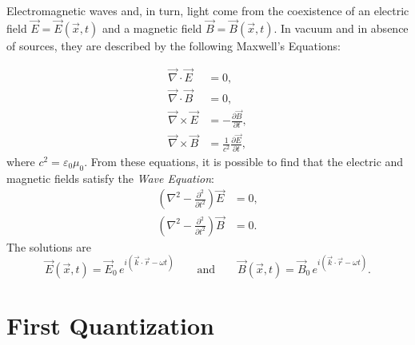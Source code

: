 %
%


Electromagnetic waves and, in turn, light come from the coexistence of an electric field $\vec{E}=\vec{E}(\Vec{x},t)$ and a magnetic field $\vec{B}=\vec{B}(\Vec{x},t)$. In vacuum and in absence of sources, they are described by 
the following  Maxwell's Equations: 

\begin{align}
    \vec{\nabla} \cdot \vec{E} &=0, \label{eq:ME1}\\
    \vec{\nabla}\cdot \vec{B} &=0,\label{eq:ME2} \\
    \vec{\nabla}\times\vec{E} &=-\frac{\partial \vec{B}}{\partial t}, \label{eq:ME3}\\
    \vec{\nabla}\times\vec{B} &=\frac{1}{c^2} \frac{\partial \vec{E}}{\partial t}, \label{eq:ME4}
\end{align}
where $c^2 = \varepsilon_0 \mu_0$. 
From these equations, it is possible to find that the electric and magnetic fields satisfy the \textit{Wave Equation}:
\begin{align}
         \left(\nabla^{2}-\frac{\partial^{2}}{\partial t^{2}}\right)\vec{E} &= 0, \\
         \left(\nabla^{2}-\frac{\partial^{2}}{\partial t^{2}}\right)\vec{B} &= 0.
\end{align}
The solutions are
 \begin{equation}
     \vec{E}(\vec{x},t)=\vec{E}_{0} \, e^{i(\vec{k} \cdot \vec{r}-\omega t)} \qquad \text{and} \qquad 
     \vec{B}(\vec{x},t)=\vec{B}_0 \, e^{i(\vec{k} \cdot \vec{r}-\omega t)}. 
 \end{equation}

\section{First Quantization}
